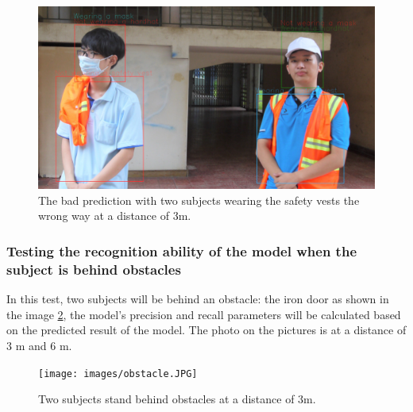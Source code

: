 \documentclass[conference]{IEEEtran}
\begin{document}
\begin{figure}[ht]
	\centerline{\includegraphics[scale=0.095]{images/bad_sv_predict_4.jpg}}
  	\caption{The bad prediction with two subjects wearing the safety vests the wrong way at a distance of 3m.}
  	\label{fig:bad_sv_pred_3}
\end{figure}

\subsubsection{Testing the recognition ability of the model when the subject is behind obstacles}
In this test, two subjects will be behind an obstacle: the iron door as shown in the image \ref{fig:obstacle}, the model's precision and recall parameters will be calculated based on the predicted result of the model. The photo on the pictures is at a distance of $ 3 $ m and $ 6 $ m.
\begin{figure}[ht]
	\centerline{\texttt{[image: images/obstacle.JPG]}}
  	\caption{Two subjects stand behind obstacles at a distance of 3m.}
  	\label{fig:obstacle}
\end{figure}
\end{document}
